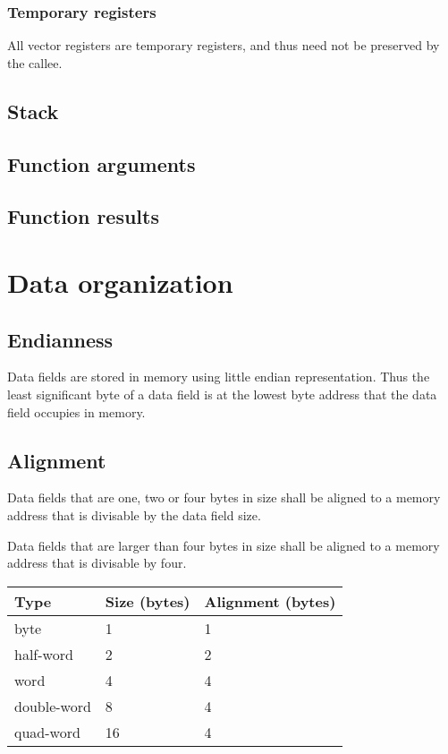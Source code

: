 \subsubsection{Temporary registers}

All vector registers are temporary registers, and thus need not be preserved
by the callee.

\subsection{Stack}
\label{sec:abi_stack}

\tbd

\subsection{Function arguments}
\label{sec:abi_function_arguments}

\tbd

\subsection{Function results}
\label{sec:abi_function_results}

\tbd

\section{Data organization}

\subsection{Endianness}

Data fields are stored in memory using little endian representation. Thus the
least significant byte of a data field is at the lowest byte address that the
data field occupies in memory.

\subsection{Alignment}

Data fields that are one, two or four bytes in size shall be aligned to a
memory address that is divisable by the data field size.

Data fields that are larger than four bytes in size shall be aligned to a
memory address that is divisable by four.

\begin{tabular}{|l|l|l|}
  \hline
  \textbf{Type} & \textbf{Size (bytes)} & \textbf{Alignment (bytes)} \\
  \hline
  byte & 1 & 1 \\
  \hline
  half-word & 2 & 2 \\
  \hline
  word & 4 & 4 \\
  \hline
  double-word & 8 & 4 \\
  \hline
  quad-word & 16 & 4 \\
  \hline
\end{tabular}
